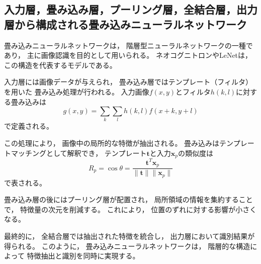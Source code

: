 \subsection{入力層，畳み込み層，プーリング層，全結合層，出力層から構成される畳み込みニューラルネットワーク}

畳み込みニューラルネットワークは，
階層型ニューラルネットワークの一種であり，
主に画像認識を目的として用いられる。
ネオコグニトロンやLeNetは，
この構造を代表するモデルである。

入力層には画像データが与えられ，
畳み込み層ではテンプレート（フィルタ）を用いた
畳み込み処理が行われる。
入力画像$f(x,y)$とフィルタ$h(k,l)$に対する畳み込みは
\[
g(x,y) = \sum_k \sum_l h(k,l) f(x+k, y+l)
\]
で定義される。

この処理により，
画像中の局所的な特徴が抽出される。
畳み込みはテンプレートマッチングとして解釈でき，
テンプレート$\mathbf{t}$と入力$\mathbf{x}_p$の類似度は
\[
R_p = \cos\theta =
\frac{\mathbf{t}^T \mathbf{x}_p}{\|\mathbf{t}\| \|\mathbf{x}_p\|}
\]
で表される。

畳み込み層の後にはプーリング層が配置され，
局所領域の情報を集約することで，
特徴量の次元を削減する。
これにより，
位置のずれに対する影響が小さくなる。

最終的に，
全結合層では抽出された特徴を統合し，
出力層において識別結果が得られる。
このように，
畳み込みニューラルネットワークは，
階層的な構造によって
特徴抽出と識別を同時に実現する。